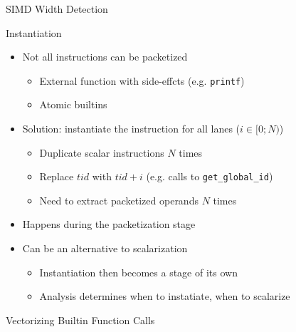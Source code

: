 
\begin{frame}{SIMD Width Detection}

\end{frame}


\begin{frame}{Instantiation}

\begin{itemize}
    \item Not all instructions can be packetized
    \begin{itemize}
        \item External function with side-effcts (e.g. \texttt{printf})
        \item Atomic builtins
    \end{itemize}
    \item Solution: instantiate the instruction for all lanes ($i \in [0;N)$)
    \begin{itemize}
        \item Duplicate scalar instructions $N$ times
        \item Replace $tid$ with \texttt{$tid + i$} (e.g. calls to \texttt{get\_global\_id})
        \item Need to extract packetized operands $N$ times %
    \end{itemize}
    \item Happens during the packetization stage
    \item Can be an alternative to scalarization
    \begin{itemize}
        \item Instantiation then becomes a stage of its own
        \item Analysis determines when to instatiate, when to scalarize
    \end{itemize}
\end{itemize}

\end{frame}


\begin{frame}{Vectorizing Builtin Function Calls}


\end{frame}

